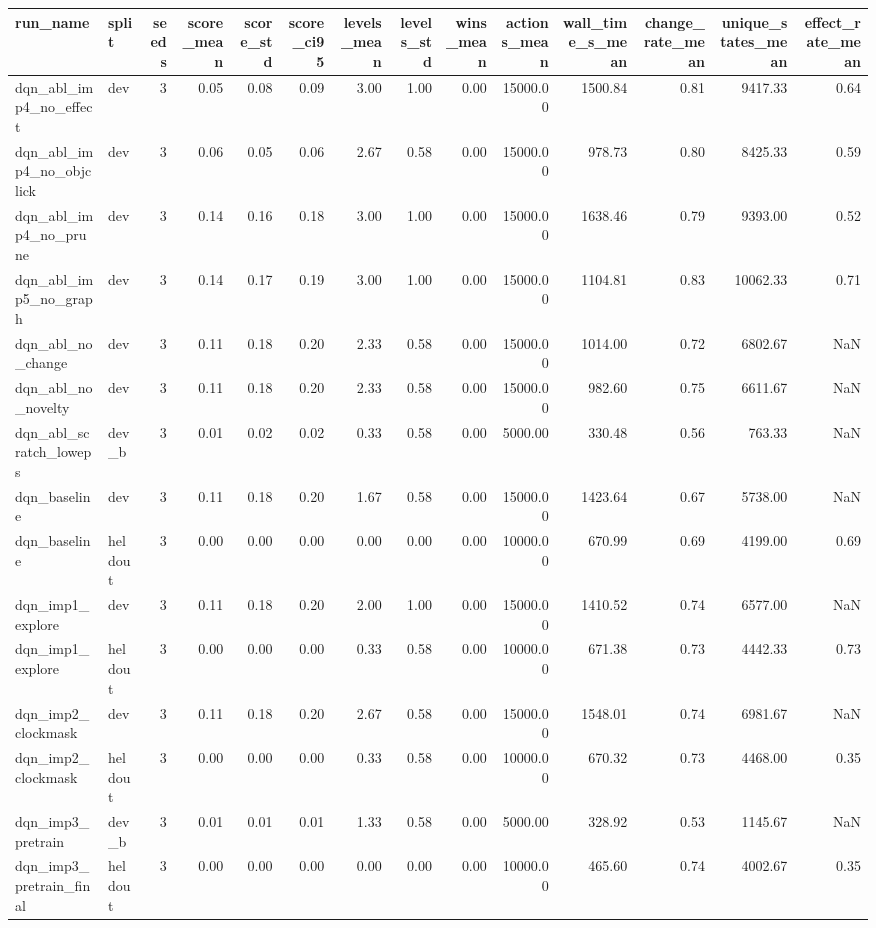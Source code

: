 \begin{tabular}{llrrrrrrrrrrrr}
\toprule
run_name & split & seeds & score_mean & score_std & score_ci95 & levels_mean & levels_std & wins_mean & actions_mean & wall_time_s_mean & change_rate_mean & unique_states_mean & effect_rate_mean \\
\midrule
dqn_abl_imp4_no_effect & dev & 3 & 0.05 & 0.08 & 0.09 & 3.00 & 1.00 & 0.00 & 15000.00 & 1500.84 & 0.81 & 9417.33 & 0.64 \\
dqn_abl_imp4_no_objclick & dev & 3 & 0.06 & 0.05 & 0.06 & 2.67 & 0.58 & 0.00 & 15000.00 & 978.73 & 0.80 & 8425.33 & 0.59 \\
dqn_abl_imp4_no_prune & dev & 3 & 0.14 & 0.16 & 0.18 & 3.00 & 1.00 & 0.00 & 15000.00 & 1638.46 & 0.79 & 9393.00 & 0.52 \\
dqn_abl_imp5_no_graph & dev & 3 & 0.14 & 0.17 & 0.19 & 3.00 & 1.00 & 0.00 & 15000.00 & 1104.81 & 0.83 & 10062.33 & 0.71 \\
dqn_abl_no_change & dev & 3 & 0.11 & 0.18 & 0.20 & 2.33 & 0.58 & 0.00 & 15000.00 & 1014.00 & 0.72 & 6802.67 & NaN \\
dqn_abl_no_novelty & dev & 3 & 0.11 & 0.18 & 0.20 & 2.33 & 0.58 & 0.00 & 15000.00 & 982.60 & 0.75 & 6611.67 & NaN \\
dqn_abl_scratch_loweps & dev_b & 3 & 0.01 & 0.02 & 0.02 & 0.33 & 0.58 & 0.00 & 5000.00 & 330.48 & 0.56 & 763.33 & NaN \\
dqn_baseline & dev & 3 & 0.11 & 0.18 & 0.20 & 1.67 & 0.58 & 0.00 & 15000.00 & 1423.64 & 0.67 & 5738.00 & NaN \\
dqn_baseline & heldout & 3 & 0.00 & 0.00 & 0.00 & 0.00 & 0.00 & 0.00 & 10000.00 & 670.99 & 0.69 & 4199.00 & 0.69 \\
dqn_imp1_explore & dev & 3 & 0.11 & 0.18 & 0.20 & 2.00 & 1.00 & 0.00 & 15000.00 & 1410.52 & 0.74 & 6577.00 & NaN \\
dqn_imp1_explore & heldout & 3 & 0.00 & 0.00 & 0.00 & 0.33 & 0.58 & 0.00 & 10000.00 & 671.38 & 0.73 & 4442.33 & 0.73 \\
dqn_imp2_clockmask & dev & 3 & 0.11 & 0.18 & 0.20 & 2.67 & 0.58 & 0.00 & 15000.00 & 1548.01 & 0.74 & 6981.67 & NaN \\
dqn_imp2_clockmask & heldout & 3 & 0.00 & 0.00 & 0.00 & 0.33 & 0.58 & 0.00 & 10000.00 & 670.32 & 0.73 & 4468.00 & 0.35 \\
dqn_imp3_pretrain & dev_b & 3 & 0.01 & 0.01 & 0.01 & 1.33 & 0.58 & 0.00 & 5000.00 & 328.92 & 0.53 & 1145.67 & NaN \\
dqn_imp3_pretrain_final & heldout & 3 & 0.00 & 0.00 & 0.00 & 0.00 & 0.00 & 0.00 & 10000.00 & 465.60 & 0.74 & 4002.67 & 0.35 \\

\end{tabular}
